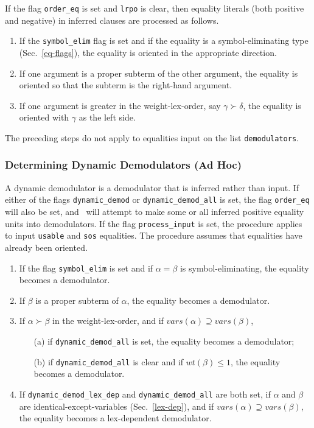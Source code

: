 \documentclass[11pt]{article}
\begin{document}
If the flag \verb:order_eq: is set and \verb:lrpo: is clear, then
equality literals (both positive and negative) in inferred
clauses are processed as follows.  
\begin{enumerate}
\item
If the \verb:symbol_elim: flag is set and if the equality is a
symbol-eliminating type (Sec.~\ref{eq-flags}), the
equality is oriented in the appropriate direction.
\item
If one argument is a proper subterm of the other argument,
the equality is oriented so that the subterm is the right-hand argument.
\item
If one argument is greater in the weight-lex-order, say
$\gamma\succ\delta$,
the equality is oriented with $\gamma$ as the left side.
\end{enumerate}
The preceding steps do not apply to equalities input on the list
\verb:demodulators:.

\subsubsection{Determining Dynamic Demodulators (Ad Hoc)}  \label{dynamic}

A dynamic demodulator is a demodulator that is inferred rather than
input.  If either of the flags \verb:dynamic_demod: or
\verb:dynamic_demod_all: is set, the flag \verb:order_eq: will also be
set, and \otter\ will attempt to make some or all inferred positive
equality units into demodulators.  If the flag \verb:process_input:
is set, the procedure applies to input \verb:usable: and \verb:sos:
equalities.
The procedure assumes that equalities have already been oriented.
\begin{enumerate}
\item
If the flag \verb:symbol_elim: is set and if $\alpha=\beta$ is
symbol-eliminating, the equality becomes a demodulator.
\item
If $\beta$ is a proper subterm of $\alpha$, the equality becomes a
demodulator.
\item
If $\alpha\succ\beta$ in the weight-lex-order, and if 
$vars(\alpha) \supseteq vars(\beta)$,
\begin{itemize}
\item[(a)]
if \verb:dynamic_demod_all: is set, the equality becomes a
demodulator;
\item[(b)]
if \verb:dynamic_demod_all: is clear and if $wt(\beta) \leq 1$, the
equality becomes a demodulator.
\end{itemize}
\item
If \verb:dynamic_demod_lex_dep: and \verb:dynamic_demod_all: are both set,
if $\alpha$ and $\beta$ are identical-except-variables (Sec.~\ref{lex-dep}),
and if $vars(\alpha) \supseteq vars(\beta)$,
the equality becomes a lex-dependent demodulator.
\end{enumerate}
\end{document}
